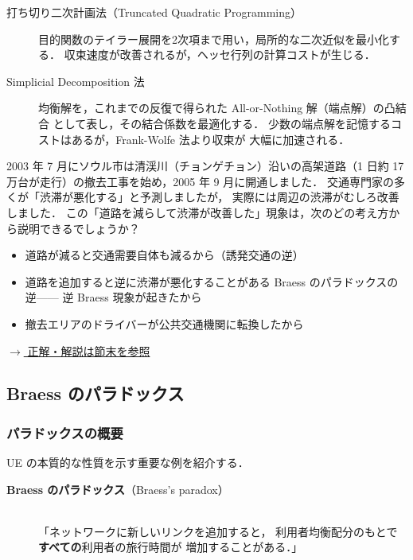 \begin{description}
  \item[打ち切り二次計画法（Truncated Quadratic Programming）]
    目的関数のテイラー展開を2次項まで用い，局所的な二次近似を最小化する．
    収束速度が改善されるが，ヘッセ行列の計算コストが生じる．
  \item[Simplicial Decomposition 法]
    均衡解を，これまでの反復で得られた All-or-Nothing 解（端点解）の凸結合
    として表し，その結合係数を最適化する．
    少数の端点解を記憶するコストはあるが，Frank-Wolfe 法より収束が
    大幅に加速される．
\end{description}

\begin{example}[title={クイズ 5：ソウルの高架道路を撤去したら，渋滞が改善した——なぜ？}]
2003 年 7 月にソウル市は清渓川（チョンゲチョン）沿いの高架道路（1 日約 17 万台が走行）の撤去工事を始め，2005 年 9 月に開通しました．
交通専門家の多くが「渋滞が悪化する」と予測しましたが，
実際には周辺の渋滞がむしろ改善しました．
この「道路を減らして渋滞が改善した」現象は，次のどの考え方から説明できるでしょうか？
\begin{itemize}
  \item[(ア)] 道路が減ると交通需要自体も減るから（誘発交通の逆）
  \item[(イ)] 道路を追加すると逆に渋滞が悪化することがある Braess のパラドックスの逆——
             逆 Braess 現象が起きたから
  \item[(ウ)] 撤去エリアのドライバーが公共交通機関に転換したから
\end{itemize}
\hyperref[ans:q5]{$\rightarrow$ 正解・解説は節末を参照}
\end{example}

\subsection{Braess のパラドックス}
\label{subsec:braess}

\subsubsection*{パラドックスの概要}

UE の本質的な性質を示す重要な例を紹介する\cite{Braess1968}．

\begin{description}
  \item[\textbf{Braess のパラドックス}（Braess's paradox）] \mbox{}\\
    「ネットワークに新しいリンクを追加すると，
    利用者均衡配分のもとで\textbf{すべての}利用者の旅行時間が
    増加することがある．」
\end{description}

